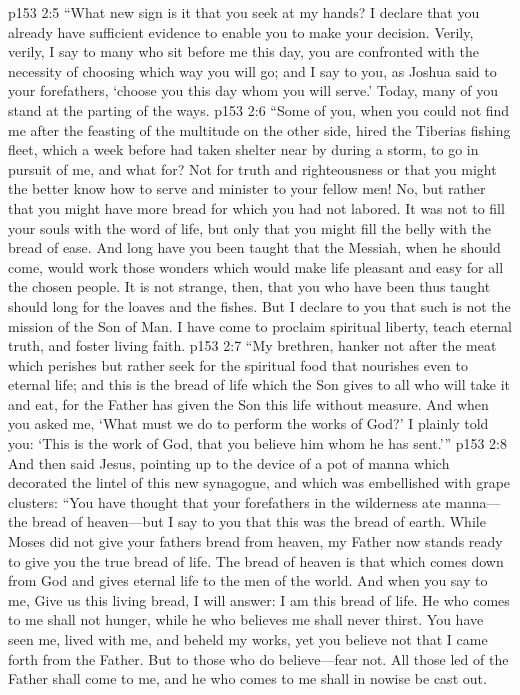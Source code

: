\vs p153 2:5 \textcolor{ubdarkred}{“What new sign is it that you seek at my hands? I declare that you already have sufficient evidence to enable you to make your decision. Verily, verily, I say to many who sit before me this day, you are confronted with the necessity of choosing which way you will go; and I say to you, as Joshua said to your forefathers, ‘choose you this day whom you will serve.’ Today, many of you stand at the parting of the ways.}
\vs p153 2:6 \textcolor{ubdarkred}{“Some of you, when you could not find me after the feasting of the multitude on the other side, hired the Tiberias fishing fleet, which a week before had taken shelter near by during a storm, to go in pursuit of me, and what for? Not for truth and righteousness or that you might the better know how to serve and minister to your fellow men! No, but rather that you might have more bread for which you had not labored. It was not to fill your souls with the word of life, but only that you might fill the belly with the bread of ease. And long have you been taught that the Messiah, when he should come, would work those wonders which would make life pleasant and easy for all the chosen people. It is not strange, then, that you who have been thus taught should long for the loaves and the fishes. But I declare to you that such is not the mission of the Son of Man. I have come to proclaim spiritual liberty, teach eternal truth, and foster living faith.}
\vs p153 2:7 \textcolor{ubdarkred}{“My brethren, hanker not after the meat which perishes but rather seek for the spiritual food that nourishes even to eternal life; and this is the bread of life which the Son gives to all who will take it and eat, for the Father has given the Son this life without measure. And when you asked me, ‘What must we do to perform the works of God?’ I plainly told you: ‘This is the work of God, that you believe him whom he has sent.’”}
\vs p153 2:8 And then said Jesus, pointing up to the device of a pot of manna which decorated the lintel of this new synagogue, and which was embellished with grape clusters: \textcolor{ubdarkred}{“You have thought that your forefathers in the wilderness ate manna---the bread of heaven---but I say to you that this was the bread of earth. While Moses did not give your fathers bread from heaven, my Father now stands ready to give you the true bread of life. The bread of heaven is that which comes down from God and gives eternal life to the men of the world. And when you say to me, Give us this living bread, I will answer: I am this bread of life. He who comes to me shall not hunger, while he who believes me shall never thirst. You have seen me, lived with me, and beheld my works, yet you believe not that I came forth from the Father. But to those who do believe---fear not. All those led of the Father shall come to me, and he who comes to me shall in nowise be cast out.}
